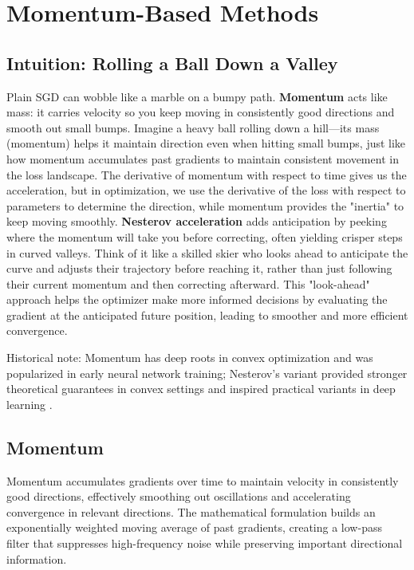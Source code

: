 
\section{Momentum-Based Methods }
\label{sec:momentum}

\subsection{Intuition: Rolling a Ball Down a Valley}

Plain SGD can wobble like a marble on a bumpy path. \textbf{Momentum} acts like mass: it carries velocity so you keep moving in consistently good directions and smooth out small bumps. Imagine a heavy ball rolling down a hill—its mass (momentum) helps it maintain direction even when hitting small bumps, just like how momentum accumulates past gradients to maintain consistent movement in the loss landscape. The derivative of momentum with respect to time gives us the acceleration, but in optimization, we use the derivative of the loss with respect to parameters to determine the direction, while momentum provides the "inertia" to keep moving smoothly. \textbf{Nesterov acceleration} adds anticipation by peeking where the momentum will take you before correcting, often yielding crisper steps in curved valleys. Think of it like a skilled skier who looks ahead to anticipate the curve and adjusts their trajectory before reaching it, rather than just following their current momentum and then correcting afterward. This "look-ahead" approach helps the optimizer make more informed decisions by evaluating the gradient at the anticipated future position, leading to smoother and more efficient convergence.

Historical note: Momentum has deep roots in convex optimization and was popularized in early neural network training; Nesterov's variant provided stronger theoretical guarantees in convex settings and inspired practical variants in deep learning \cite{Polyak1964,Nesterov1983,GoodfellowEtAl2016,Bishop2006}.

\subsection{Momentum}

Momentum accumulates gradients over time to maintain velocity in consistently good directions, effectively smoothing out oscillations and accelerating convergence in relevant directions. The mathematical formulation builds an exponentially weighted moving average of past gradients, creating a low-pass filter that suppresses high-frequency noise while preserving important directional information.


